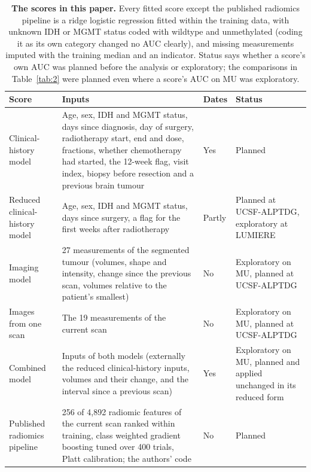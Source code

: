 \begin{table}[!htbp]
\centering
\caption[The scores in this paper]{\textbf{The scores in this paper.} Every fitted score except the published
radiomics pipeline is a ridge logistic regression fitted within the training data, with unknown IDH or MGMT status coded
with wildtype and unmethylated (coding it as its own category changed no AUC clearly), and missing measurements imputed with the training median and an indicator. Status says whether
a score's own AUC was planned before the analysis or exploratory; the comparisons in Table~\ref{tab:2} were planned
even where a score's AUC on MU was exploratory.}
\label{tab:models}
\footnotesize
\zebrarows
\begin{tabularx}{\linewidth}{@{}R{2.9cm}LR{1.3cm}R{3.4cm}@{}}
\toprule
Score & Inputs & Dates & Status \\
\midrule
Clinical-history model & Age, sex, IDH and MGMT status, days since diagnosis, day of surgery, radiotherapy start, end and dose, fractions, whether chemotherapy had started, the 12-week flag, visit index, biopsy before resection and a previous brain tumour & Yes & Planned \\
Reduced clinical-history model & Age, sex, IDH and MGMT status, days since surgery, a flag for the first weeks after radiotherapy & Partly & Planned at UCSF-ALPTDG, exploratory at LUMIERE \\
Imaging model & 27 measurements of the segmented tumour (volumes, shape and intensity, change since the previous scan, volumes relative to the patient's smallest) & No & Exploratory on MU, planned at UCSF-ALPTDG \\
Images from one scan & The 19 measurements of the current scan & No & Exploratory on MU, planned at UCSF-ALPTDG \\
Combined model & Inputs of both models (externally the reduced clinical-history inputs, volumes and their change, and the interval since a previous scan) & Yes & Exploratory on MU, planned and applied unchanged in its reduced form \\
\addlinespace
Published radiomics pipeline & 256 of 4,892 radiomic features of the current scan ranked within training, class weighted gradient boosting tuned over 400 trials, Platt calibration; the authors' code \citep{christodoulou2026} & No & Planned \\

\end{tabularx}
\end{table}
